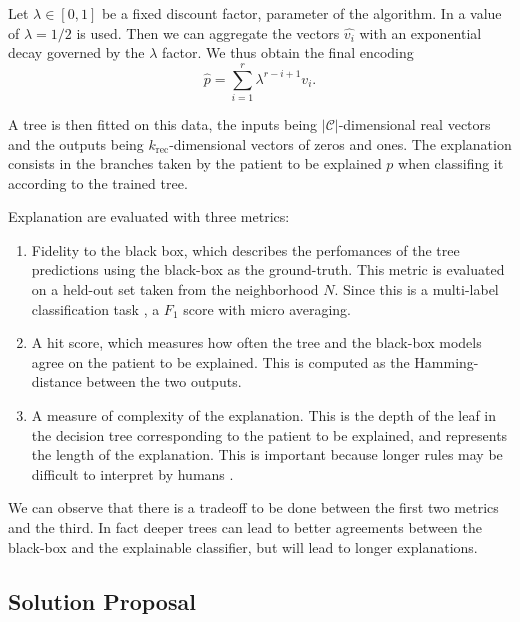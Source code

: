 \documentclass[]{marticle}
\newcommand{\codes}{\mathcal{C}}
\begin{document}
Let $\lambda\in [0,1]$ be a fixed discount factor, parameter of the algorithm. In
\cite{panigutti-xai} a value of $\lambda = 1/2$ is used. Then we can aggregate the vectors
$\hat{v_i}$ with an exponential decay governed by the $\lambda$ factor. We thus obtain the final
encoding
\begin{equation*}
    \hat{p} = \sum_{i=1}^r \lambda^{r-i+1} v_i.
\end{equation*}

A tree is then fitted on this data, the inputs being $|\codes|$-dimensional real vectors and the
outputs being $k_\text{rec}$-dimensional vectors of zeros and ones. The explanation consists in the
branches taken by the patient to be explained $p$ when classifing it according to the trained tree.

Explanation are evaluated with three metrics:
\begin{enumerate}
\item Fidelity to the black box, which describes the perfomances of the tree predictions using the
black-box as the ground-truth. This metric is evaluated on a held-out set taken from the
neighborhood $N$. Since this is a multi-label classification task \cite{paper-multi-label}, a $F_1$
score with micro averaging.

\item A hit score, which measures how often the tree and the black-box models agree on the patient
to be explained. This is computed as the Hamming-distance between the two outputs.

\item A measure of complexity of the explanation. This is the depth of the leaf in the decision tree
corresponding to the patient to be explained, and represents the length of the explanation. This is
important because longer rules may be difficult to interpret by humans \cite{paper-lipton}.
\end{enumerate}

We can observe that there is a tradeoff to be done between the first two metrics and the third. In
fact deeper trees can lead to better agreements between the black-box and the explainable
classifier, but will lead to longer explanations.

\subsection{Solution Proposal}
\end{document}
